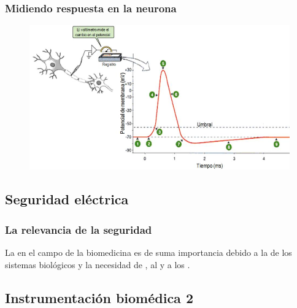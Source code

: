 \documentclass[14pt]{beamer}
\begin{document}
\begin{frame}
\frametitle{Midiendo respuesta en la neurona}
\vspace*{-1cm}
\begin{figure}
    \centering
    \includegraphics[scale=0.73]{Imagenes/Potencial_Accion_01.png}
\end{figure}
\end{frame}

\subsection{Seguridad eléctrica}

\begin{frame}
\frametitle{La relevancia de la seguridad}
La  en el campo de la biomedicina es de suma importancia \pause debido a la  de los sistemas biológicos \pause y la necesidad de , \pause al  \pause y a los .
\end{frame}

\subsection{Instrumentación biomédica 2}
\end{document}
